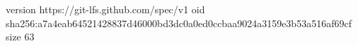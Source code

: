 version https://git-lfs.github.com/spec/v1
oid sha256:a7a4eab64521428837d46000bd3dc0a0ed0ccbaa9024a3159e3b53a516af69cf
size 63
